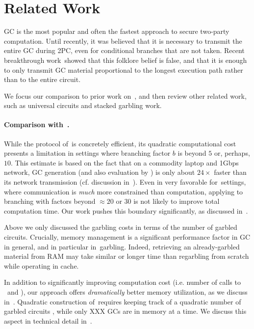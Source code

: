 \section{Related Work}\label{sec:relwork}


GC is the most popular and often the fastest approach to secure two-party computation.  Until recently, it was believed that it is necessary
to transmit the entire GC during 2PC, even for conditional branches that
are not taken.  Recent breakthrough work~\HK showed that this folklore belief is false, and that  it is enough to only transmit GC material  proportional to the
longest execution path rather than to the entire circuit.

We focus our comparison to prior work on~\HK, and then review other related work, such as universal circuits and  stacked garbling work.


\paragraph{Comparison with~\HK.}
While the protocol of~\HK is concretely efficient, its quadratic computational cost presents a  limitation in settings where branching factor $b$ is beyond $5$ or, perhaps, $10$.  This estimate is based on the fact that on a commodity laptop and 1Gbps network, GC generation (and also evaluation by \E) is only about $24\times$ faster than its network transmission (cf. discussion in~).  Even in very favorable for~\HK settings, where communication is {\em much} more constrained than computation, applying \HK to branching with factors beyond $\approx 20$ or $30$ is not likely to improve total computation time.  Our work pushes this boundary significantly, as discussed in~. 

Above we only discussed the garbling costs in terms of the number of garbled circuits.  Crucially, memory management is a significant performance factor in GC in general, and in particular in~\HK garbling.  Indeed, retrieving an already-garbled material from RAM may take similar or longer time than regarbling from scratch while operating in cache.

In addition to significantly improving computation cost (i.e. number of calls to \Gb\ and \Ev), our approach offers {\em dramatically} better memory utilization, as we discuss in~.  Quadratic construction of~\HK requires keeping track of a quadratic number of garbled circuits , while only XXX GCs are in memory at a time.  We discuss this aspect in technical detail in~.

